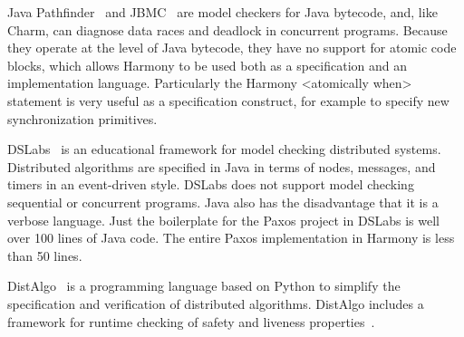 \documentclass[twocolumn]{article}
\begin{document}
Java Pathfinder~\cite{Pathfinder} and JBMC~\cite{JBMC} are model
checkers for Java bytecode, and,
like Charm, can diagnose data races and deadlock in concurrent
programs.  Because they operate at the level of Java bytecode, they
have no support for atomic code blocks, which allows Harmony to be
used both as a specification and an implementation language.
Particularly the Harmony <{atomically when}> statement is very
useful as a specification construct, for example to specify new
synchronization primitives.

DSLabs~\cite{MWA19} is an educational framework for model checking distributed
systems.  Distributed algorithms are specified in Java in terms of
nodes, messages, and timers in an event-driven style.  DSLabs does not
support model checking sequential or concurrent programs.  Java
also has the disadvantage that it is a verbose language.  Just the
boilerplate for the Paxos project in DSLabs is well over 100 lines
of Java code.  The entire Paxos implementation in Harmony is less
than 50 lines.

Dist\-Algo~\cite{DistAlgo} is a programming language based on Python to
simplify the specification and verification of distributed algorithms.
Dist\-Algo includes a framework for runtime checking of safety and liveness
properties~\cite{LS20}.



\end{document}
